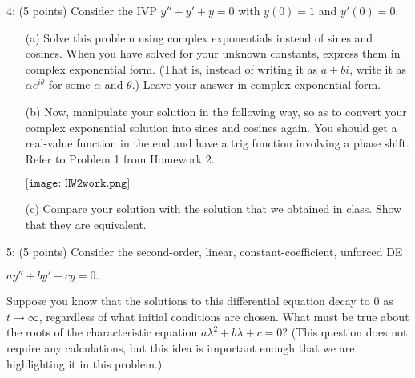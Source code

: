 \documentclass[12pt,letterpaper]{hmcpset}
\begin{document}
\begin{problem}
4: (5 points) Consider the IVP $y'' + y' + y = 0$ with $y(0) = 1$ and $y'(0) = 0$.
\begin{enumerate}
    \item[(a)]  Solve this problem using complex exponentials instead of sines and cosines. When you
have solved for your unknown constants, express them in complex exponential form.
(That is, instead of writing it as $a + bi$, write it as $\alpha e^{i\theta}$ for some $\alpha$ and $\theta$.) Leave your
answer in complex exponential form.
    \item[(b)] Now, manipulate your solution in the following way, so as to convert your complex
exponential solution into sines and cosines again. You should get a real-value function
in the end and have a trig function involving a phase shift. Refer to Problem 1 from
Homework 2.

\begin{center}
    $\texttt{[image: HW2work.png]}$
\end{center}

    \item[(c)] Compare your solution with the solution that we obtained in class. Show that they are
equivalent.
\end{enumerate}

\end{problem}
\newpage

\begin{problem}
5: (5 points) Consider the second-order, linear, constant-coefficient, unforced DE

\begin{center}
    $ay'' + by' + cy = 0.$
\end{center}

Suppose you know that the solutions to this differential equation decay to $0$ as $t \rightarrow \infty$,
regardless of what initial conditions are chosen. What must be true about the roots of the
characteristic equation $a\lambda^2 + b\lambda + c = 0$? (This question does not require any calculations,
but this idea is important enough that we are highlighting it in this problem.)
\end{problem}
\end{document}
